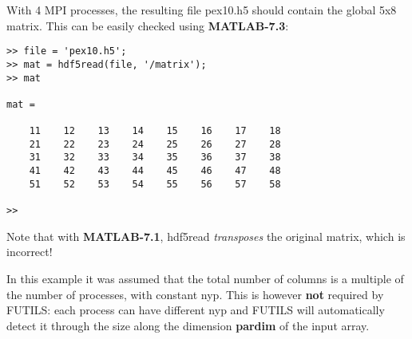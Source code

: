 \documentclass[a4paper]{article}
\begin{document}
With 4 MPI processes,
the resulting file {\ttfamily pex10.h5} should contain the global 5x8
matrix. This can be easily checked using {\bfseries MATLAB-7.3}:
\begin{tscreen}
\begin{verbatim}
>> file = 'pex10.h5';
>> mat = hdf5read(file, '/matrix');
>> mat

mat =

    11    12    13    14    15    16    17    18
    21    22    23    24    25    26    27    28
    31    32    33    34    35    36    37    38
    41    42    43    44    45    46    47    48
    51    52    53    54    55    56    57    58

>>
\end{verbatim}
\end{tscreen}

Note that with {\bfseries MATLAB-7.1}, {\ttfamily hdf5read} {\itshape transposes\/} the original
matrix, which is incorrect!

In this example it was assumed that the total number of columns is a multiple of
the number of processes, with constant nyp. This is however {\bfseries not} required by
FUTILS: each process can have different nyp and FUTILS will automatically
detect it through the size along the dimension {\bfseries pardim} of the input
array.
\end{document}
